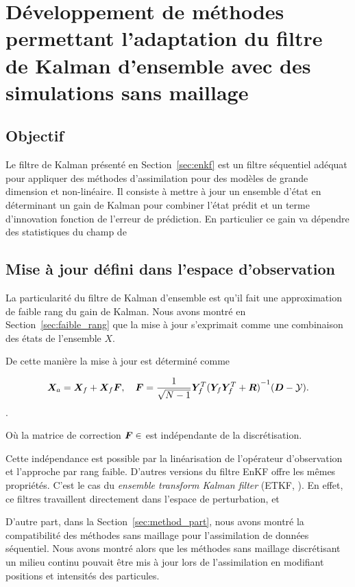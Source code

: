 
\section{Développement de méthodes permettant l'adaptation du filtre de Kalman d'ensemble avec des simulations sans maillage}

\subsection{Objectif}
Le filtre de Kalman présenté en Section~\ref*{sec:enkf} est un filtre séquentiel adéquat pour appliquer des méthodes d'assimilation pour des modèles de grande dimension et non-linéaire. Il consiste à mettre à jour un ensemble d'état en déterminant un gain de Kalman pour combiner l'état prédit et un terme d'innovation fonction de l'erreur de prédiction. En particulier ce gain va dépendre des statistiques du champ de

\subsection{Mise à jour défini dans l'espace d'observation}
La particularité du filtre de Kalman d'ensemble est qu'il fait une approximation de faible rang du gain de Kalman. Nous avons montré en Section~\ref{sec:faible_rang} que la mise à jour s'exprimait comme une combinaison des états de l'ensemble $X$.

De cette manière la mise à jour est déterminé comme

\begin{equation*}
    \bm{X}_a = \bm{X}_f + \bm{X}_f \bm{F}, \quad \bm{F} = \frac{1}{\sqrt{N-1}} \bm Y_f^T {(\bm Y_f \bm Y_f^T + \bm R)}^{-1}(\bm{D} - \mathcal{Y}).
\end{equation*}.

Où la matrice de correction $\bm{F} \in $ est indépendante de la discrétisation.

Cette indépendance est possible par la linéarisation de l'opérateur d'observation et l'approche par rang faible. D'autres versions du filtre EnKF offre les mêmes propriétés. C'est le cas du \textit{ensemble transform Kalman filter} (ETKF, \cite{Hunt2007}). En effet, ce filtres travaillent directement dans l'espace de perturbation, et




D'autre part, dans la Section~\ref{sec:method_part}, nous avons montré la compatibilité des méthodes sans maillage pour l'assimilation de données séquentiel. Nous avons montré alors que les méthodes sans maillage discrétisant un milieu continu pouvait être mis à jour lors de l'assimilation en modifiant positions et intensités des particules.

